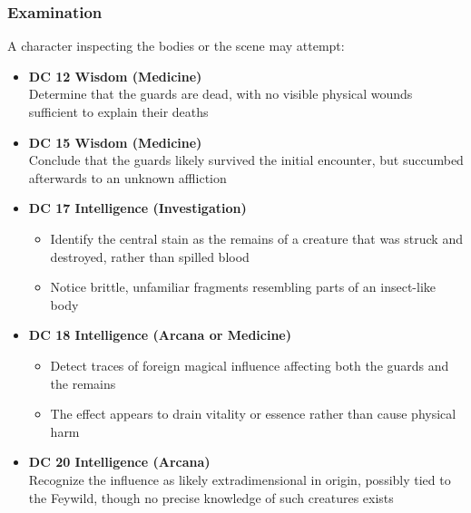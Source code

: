\subsubsection*{Examination}
{\entryfont A character inspecting the bodies or the scene may attempt:
\begin{itemize}\renewcommand\labelitemi{\textbf{\textbullet}}
	\item \textbf{DC 12 Wisdom (Medicine)}\\Determine that the guards are dead, with no visible physical wounds sufficient to explain their deaths
	\item \textbf{DC 15 Wisdom (Medicine)}\\Conclude that the guards likely survived the initial encounter, but succumbed afterwards to an unknown affliction
	\item \textbf{DC 17 Intelligence (Investigation)}
	\begin{itemize}
		\item Identify the central stain as the remains of a creature that was struck and destroyed, rather than spilled blood
		\item Notice brittle, unfamiliar fragments resembling parts of an insect-like body
	\end{itemize}
	\item \textbf{DC 18 Intelligence (Arcana or Medicine)}
	\begin{itemize}
		\item Detect traces of foreign magical influence affecting both the guards and the remains
		\item The effect appears to drain vitality or essence rather than cause physical harm
	\end{itemize}
	\item \textbf{DC 20 Intelligence (Arcana)}\\Recognize the influence as likely extradimensional in origin, possibly tied to the Feywild, though no precise knowledge of such creatures exists
\end{itemize}}
